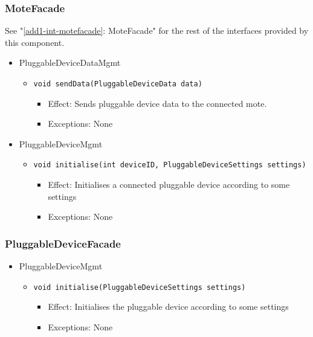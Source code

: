     \subsubsection{MoteFacade}
        See "\ref{add1-int-motefacade}: MoteFacade" for the rest of the interfaces provided by this component.
        \begin{itemize}
            \item PluggableDeviceDataMgmt
            \begin{itemize}
                \item \texttt{void sendData(PluggableDeviceData data)}
                \begin{itemize}
                    \item Effect: Sends pluggable device data to the connected mote.
                    \item Exceptions: None
                \end{itemize}
            \end{itemize}

            \item PluggableDeviceMgmt
            \begin{itemize}
                \item \texttt{void initialise(int deviceID, PluggableDeviceSettings settings)}
                \begin{itemize}
                    \item Effect: Initialises a connected pluggable device according to some settings
                    \item Exceptions: None
                \end{itemize}
            \end{itemize}
        \end{itemize}

    \subsubsection{PluggableDeviceFacade}
        \begin{itemize}
        	\item PluggableDeviceMgmt
        	\begin{itemize}
                \item \texttt{void initialise(PluggableDeviceSettings settings)}
                \begin{itemize}
                    \item Effect: Initialises the pluggable device according to some settings
                    \item Exceptions: None
                \end{itemize}
        	\end{itemize}
        \end{itemize}

